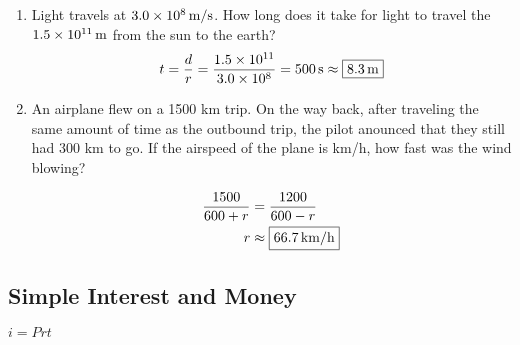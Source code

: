 \documentclass[letterpaper, landscape]{exam}
\begin{document}
\begin{enumerate}
    \item Light travels at $\unit[3.0 \times 10^8]{m/s}$. How long does it take for light to travel
      the $\unit[1.5 \times 10^{11}]{m}$ from the sun to the earth?
      \[
        t = \frac{d}{r} = \frac{1.5 \times 10^{11}}{3.0 \times 10^8} = \unit[500]{s} \approx \boxed{ \unit[8.3]{m} }
      \]

    \item An airplane flew on a 1500 km trip. On the way back, after traveling the same amount of
      time as the outbound trip, the pilot anounced that they still had 300 km to go. If the
      airspeed of the plane is \unit[600]{km/h}, how fast was the wind blowing?

      \begin{align*}
        \frac{1500}{600 + r} & = \frac{1200}{600 - r} \\
        r                    & \approx \boxed{ \unit[66.7]{km/h} } \\
      \end{align*}

  \end{enumerate}
  
  \subsection{Simple Interest and Money} %

  $i  = Prt$ 
\end{document}
